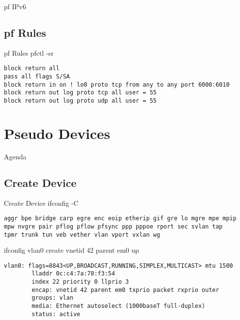 \documentclass[14pt]{beamer}
\begin{document}
\begin{frame}{pf IPv6}
\begin{framed}
\end{framed}
\end{frame}

\subsection{pf Rules}
\begin{frame}[fragile]{pf Rules}
pfctl -sr
\scriptsize
\begin{verbatim}
block return all
pass all flags S/SA
block return in on ! lo0 proto tcp from any to any port 6000:6010
block return out log proto tcp all user = 55
block return out log proto udp all user = 55
\end{verbatim}
\end{frame}

\section{Pseudo Devices}
\begin{frame}{Agenda}
\tableofcontents[currentsection]
\end{frame}

\subsection{Create Device}
\begin{frame}[fragile]{Create Device}
ifconfig -C
\scriptsize
\begin{verbatim}
aggr bpe bridge carp egre enc eoip etherip gif gre lo mgre mpe mpip
mpw nvgre pair pflog pflow pfsync ppp pppoe rport sec svlan tap
tpmr trunk tun veb vether vlan vport vxlan wg
\end{verbatim}
\normalsize
ifconfig vlan0 create vnetid 42 parent em0 up
\scriptsize
\begin{verbatim}
vlan0: flags=8843<UP,BROADCAST,RUNNING,SIMPLEX,MULTICAST> mtu 1500
        lladdr 0c:c4:7a:78:f3:54
        index 22 priority 0 llprio 3
        encap: vnetid 42 parent em0 txprio packet rxprio outer
        groups: vlan
        media: Ethernet autoselect (1000baseT full-duplex)
        status: active
\end{verbatim}
\end{frame}
\end{document}
